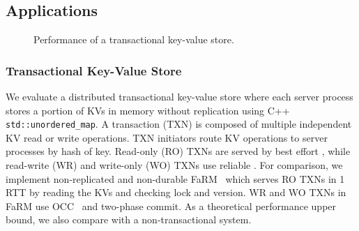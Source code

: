 \subsection{Applications}
\label{sec:application}


\begin{figure}[t]
	\centering
	\hspace{0.01\textwidth}
	\hspace{0.01\textwidth}
	\vspace{-10pt}
	\caption{Performance of a transactional key-value store.}
	\vspace{-10pt}
\end{figure}


\subsubsection{Transactional Key-Value Store}
\label{subsec:eval-kvs}


We evaluate a distributed transactional key-value store where each server process stores a portion of KVs in memory without replication using C++ \texttt{std::unordered\_map}.
A transaction (TXN) is composed of multiple independent KV read or write operations.
TXN initiators route KV operations to server processes by hash of key.
Read-only (RO) TXNs are served by best effort \sys{}, while read-write (WR) and write-only (WO) TXNs use reliable \sys{}.
For comparison, we implement non-replicated and non-durable FaRM~\cite{dragojevic2014farm} which serves RO TXNs in 1 RTT by reading the KVs and checking lock and version. WR and WO TXNs in FaRM use OCC~\cite{kung1981optimistic} and two-phase commit.
As a theoretical performance upper bound, we also compare with a non-transactional system.

